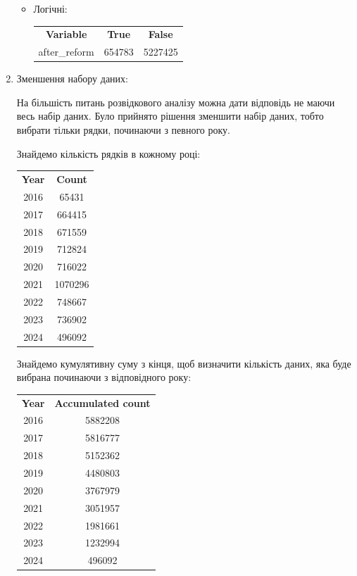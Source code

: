 \documentclass{article}
\begin{document}
\begin{enumerate}
\begin{itemize}
     \item Логічні:
     
\begin{tabular}{ccc}
\textbf{Variable} & \textbf{True} & \textbf{False} \\
after\_reform     &  654783       &  5227425       \\               
\end{tabular}    
    
    \end{itemize}
    
    \pagebreak

    \item Зменшення набору даних:

    На більшість питань розвідкового аналізу можна дати відповідь не маючи весь набір
    даних. Було прийнято рішення зменшити набір даних, тобто вибрати тільки рядки, 
    починаючи з певного року.

    Знайдемо кількість рядків в кожному році:

    \begin{tabular}{cc}
        \textbf{Year} & \textbf{Count} \\
        2016          & 65431          \\
        2017          & 664415         \\
        2018          & 671559         \\
        2019          & 712824         \\
        2020          & 716022         \\
        2021          & 1070296        \\
        2022          & 748667         \\
        2023          & 736902         \\
        2024          & 496092         \\
    \end{tabular}

    Знайдемо кумулятивну суму з кінця, щоб визначити кількість даних, яка буде вибрана 
    починаючи з відповідного року:

    \begin{tabular}{cc}
        \textbf{Year} & \textbf{Accumulated count} \\
        2016 & 5882208 \\
        2017 & 5816777 \\
        2018 & 5152362 \\
        2019 & 4480803 \\
        2020 & 3767979 \\
        2021 & 3051957 \\
        2022 & 1981661 \\
        2023 & 1232994 \\
        2024 & 496092  \\
    \end{tabular}


\end{enumerate}
\end{document}
